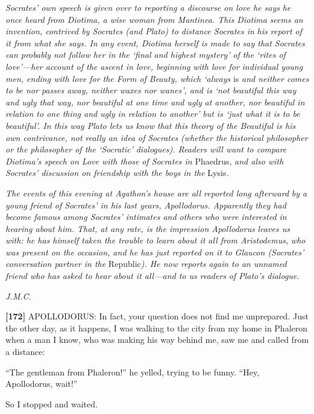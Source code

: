 {\em Socrates' own speech is given over to reporting a discourse on love
he says} {\em he once heard from Diotima, a wise woman from Mantinea.
This Diotima} {\em seems an invention, contrived by Socrates (and Plato)
to distance Socrates in} {\em his report of it from what she says. In
any event, Diotima herself is made to} {\em say that Socrates can
probably not follow her in the ‘final and highest mystery'} {\em of the
‘rites of love'---her account of the ascent in love, beginning with love
for} {\em individual young men, ending with love for the Form of Beauty,
which ‘always} is {\em and neither comes to be nor passes away, neither
waxes nor wanes', and is} {\em ‘not beautiful this way and ugly that
way, nor beautiful at one time and ugly} {\em at another, nor beautiful
in relation to one thing and ugly in relation to another'} {\em but is
‘just what it is to be beautiful'. In this way Plato lets us know}
{\em that this theory of the Beautiful is his own contrivance, not
really an idea of} {\em Socrates (whether the historical philosopher or
the philosopher of the ‘Socratic'} {\em dialogues). Readers will want to
compare Diotima's speech on Love with those} {\em of Socrates in}
Phaedrus, {\em and also with Socrates' discussion on friendship with}
{\em the boys in the} Lysis{\em .}

{\em The events of this evening at Agathon's house are all reported long
afterward} {\em by a young friend of Socrates' in his last years,
Apollodorus. Apparently} {\em they had become famous among Socrates'
intimates and others who were interested} {\em in hearing about him.
That, at any rate, is the impression Apollodorus} {\em leaves us with:
he has himself taken the trouble to learn about it all from
Aristodemus,} {\em who was present on the occasion, and he has just
reported on it to} {\em Glaucon (Socrates' conversation partner in the}
Republic{\em ). He now reports} {\em again to an unnamed friend who has
asked to hear about it all---and to us readers} {\em of Plato's
dialogue.}

{\em J.M.C.}\crlf
\crlf
\crlf

{\bf {[}172{]}} APOLLODORUS: In fact, your question does not find me
unprepared. Just the other day, as it happens, I was walking to the city
from my home in Phaleron when a man I know, who was making his way
behind me, saw me and called from a distance:

“The gentleman from Phaleron!” he yelled, trying to be funny. “Hey,
Apollodorus, wait!”

So I stopped and waited.

